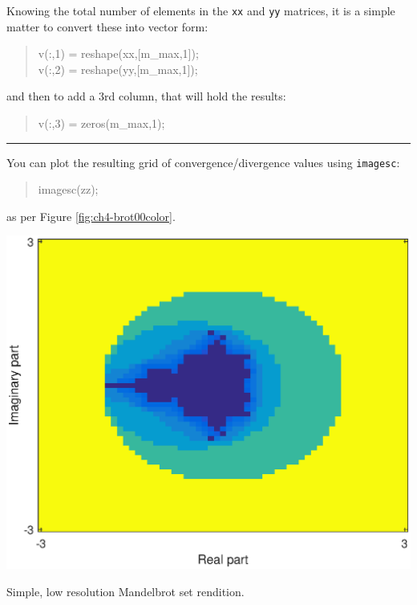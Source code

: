\documentclass{tufte-book} %
\newenvironment{docspec}{\begin{quotation}\ttfamily\parskip0pt\parindent0pt\ignorespaces}{\end{quotation}}
\begin{document}
Knowing the total number of elements in the \texttt{xx} and \texttt{yy} matrices, it is a simple matter to convert these into vector form: 
\begin{docspec}
v(:,1) = reshape(xx,[m\_max,1]);\\
v(:,2) = reshape(yy,[m\_max,1]);
\end{docspec}
and then to add a 3rd column, that will hold the results:
\begin{docspec}
v(:,3) = zeros(m\_max,1);
\end{docspec}

\vspace{1mm}
\noindent\rule{4cm}{0.5pt}
\vspace{2mm}

\noindent You can plot the resulting grid of convergence/divergence values using \texttt{imagesc}:
\begin{docspec}
imagesc(zz);
\end{docspec}
as per Figure \ref{fig:ch4-brot00color}.

\begin{marginfigure}[0.0in]
\includegraphics[width=\linewidth]{ch4-brot00color.eps}
\caption{Simple, low resolution Mandelbrot set rendition.}
\label{fig:ch4-brot00color}
\end{marginfigure}
\end{document}
